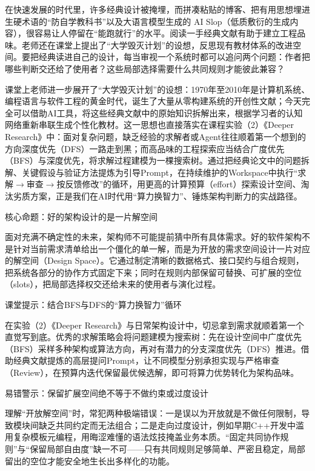 \documentclass[UTF8,a4paper,11pt,fontset=fandol]{ctexart}
\begin{document}
在快速发展的时代里，许多经典设计被掩埋，而拼凑粘贴的博客、把有用思想埋进生硬术语的“防自学教科书”以及大语言模型生成的 AI Slop（低质敷衍的生成内容），很容易让人停留在“能跑就行”的水平。阅读一手经典文献有助于建立工程品味。老师还在课堂上提出了“大学毁灭计划”的设想，反思现有教材体系的改进空间。要把经典读进自己的设计，每当审视一个系统时都可以追问两个问题：作者把哪些判断交还给了使用者？这些局部选择需要什么共同规则才能彼此兼容？

课堂上老师进一步展开了“大学毁灭计划”的设想：1970年至2010年是计算机系统、编程语言与软件工程的黄金时代，诞生了大量从零构建系统的开创性文献；今天完全可以借助AI工具，将这些经典文献中的原始知识拆解出来，根据学习者的认知网络重新串联生成个性化教材。这一思想也直接落实在课程实验（2）《Deeper Research》中：面对复杂问题，缺乏经验的求解者或Agent往往顺着第一个想到的方向深度优先（DFS）一路走到黑；而高品味的工程探索应当结合广度优先（BFS）与深度优先，将求解过程建模为一棵搜索树。通过把经典论文中的问题拆解、关键假设与验证方法提炼为引导Prompt，在持续维护的Workspace中执行“求解\ensuremath{\rightarrow}审查\ensuremath{\rightarrow}按反馈修改”的循环，用更高的计算预算（effort）探索设计空间、淘汰劣质方案，正是我们在AI时代用“算力换智力”、锤炼架构判断力的实战路径。

\begin{importantbox}{核心命题：好的架构设计的是一片解空间}

面对充满不确定性的未来，架构师不可能提前猜中所有具体需求。好的软件架构不是针对当前需求清单给出一个僵化的单一解，而是为开放的需求空间设计一片对应的解空间（Design Space）。它通过制定清晰的数据格式、接口契约与组合规则，把系统各部分的协作方式固定下来；同时在规则内部保留可替换、可扩展的空位（slots），把局部选择权交还给未来的使用者与演化过程。

\end{importantbox}

\begin{knowledgebox}{课堂提示：结合BFS与DFS的“算力换智力”循环}

在实验（2）《Deeper Research》与日常架构设计中，切忌拿到需求就顺着第一个直觉写到底。优秀的求解策略会将问题建模为搜索树：先在设计空间中广度优先（BFS）采样多种架构或算法方向，再对有潜力的分支深度优先（DFS）推进。借助经典文献提炼的高层提问Prompt，让不同模型分别承担实现与严格审查（Review），在预算内迭代保留最优候选解，即可将算力优势转化为架构品味。

\end{knowledgebox}

\begin{warningbox}{易错警示：保留扩展空间绝不等于不做约束或过度设计}

理解“开放解空间”时，常犯两种极端错误：一是误以为开放就是不做任何限制，导致模块间缺乏共同约定而无法组合；二是走向过度设计，例如早期C++开发中滥用复杂模板元编程，用晦涩难懂的语法炫技掩盖业务本质。“固定共同协作规则”与“保留局部自由度”缺一不可——只有共同规则足够简单、严密且稳定，局部留出的空位才能安全地生长出多样化的功能。

\end{warningbox}
\end{document}
